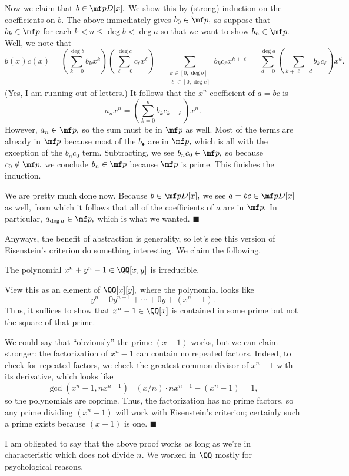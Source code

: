 Now we claim that $b\in\mf pD[x].$ We show this by (strong) induction on the coefficients on $b.$ The above immediately gives $b_0\in\mf p,$ so suppose that $b_k\in\mf p$ for each $k<n\le\deg b<\deg a$ so that we want to show $b_n\in\mf p.$ Well, we note that
\[b(x)c(x)=\left(\sum_{k=0}^{\deg b}b_kx^k\right)\left(\sum_{\ell=0}^{\deg c}c_\ell x^\ell\right)=\sum_{\substack{k\in[0,\deg b]\\\ell\in[0,\deg c]}}b_kc_\ell x^{k+\ell}=\sum_{d=0}^{\deg a}\left(\sum_{k+\ell=d}b_kc_\ell\right)x^d.\]
(Yes, I am running out of letters.) It follows that the $x^n$ coefficient of $a=bc$ is
\[a_nx^n=\left(\sum_{k=0}^nb_kc_{k-\ell}\right)x^n.\]
However, $a_n\in\mf p,$ so the sum must be in $\mf p$ as well. Most of the terms are already in $\mf p$ because most of the $b_\bullet$ are in $\mf p,$ which is all with the exception of the $b_nc_0$ term. Subtracting, we see $b_nc_0\in\mf p,$ so because $c_0\notin\mf p,$ we conclude $b_n\in\mf p$ because $\mf p$ is prime. This finishes the induction.

We are pretty much done now. Because $b\in\mf pD[x],$ we see $a=bc\in\mf pD[x]$ as well, from which it follows that all of the coefficients of $a$ are in $\mf p.$ In particular, $a_{\deg a}\in\mf p,$ which is what we wanted. $\blacksquare$

Anyways, the benefit of abstraction is generality, so let's see this version of Eisenstein's criterion do something interesting. We claim the following.
\begin{proposition}
    The polynomial $x^n+y^n-1\in\QQ[x,y]$ is irreducible.
\end{proposition}
View this as an element of $\QQ[x][y],$ where the polynomial looks like
\[y^n+0y^{n-1}+\cdots+0y+\left(x^n-1\right).\]
Thus, it suffices to show that $x^n-1\in\QQ[x]$ is contained in some prime but not the square of that prime.

We could say that ``obviously'' the prime $(x-1)$ works, but we can claim stronger: the factorization of $x^n-1$ can contain no repeated factors. Indeed, to check for repeated factors, we check the greatest common divisor of $x^n-1$ with its derivative, which looks like
\[\gcd\left(x^n-1,nx^{n-1}\right)\mid(x/n)\cdot nx^{n-1}-\left(x^n-1\right)=1,\]
so the polynomials are coprime. Thus, the factorization has no prime factors, so any prime dividing $\left(x^n-1\right)$ will work with Eisenstein's criterion; certainly such a prime exists because $(x-1)$ is one. $\blacksquare$

I am obligated to say that the above proof works as long as we're in characteristic which does not divide $n.$ We worked in $\QQ$ mostly for psychological reasons.

